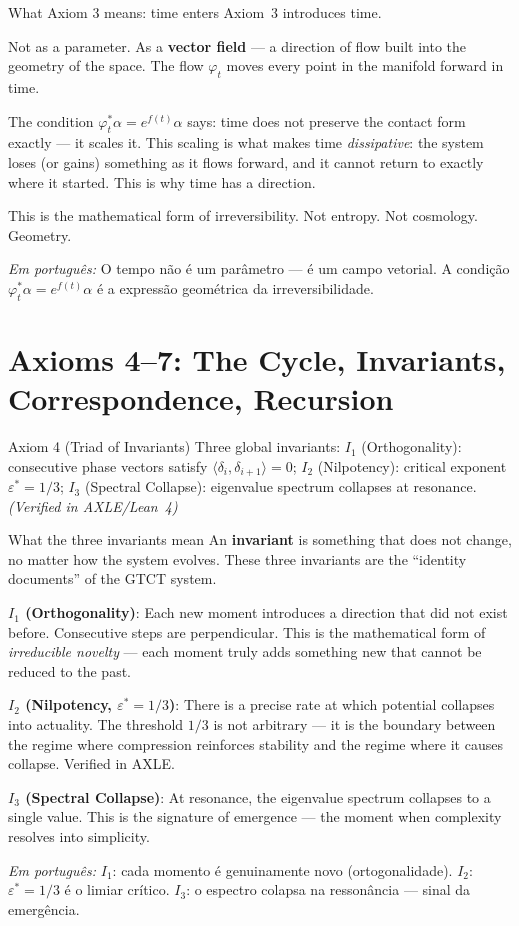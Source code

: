 \documentclass[12pt, openright]{book}
\theoremstyle{definition}
\theoremstyle{remark}
\begin{document}
\begin{studentbox}{What Axiom 3 means: time enters}
Axiom~3 introduces time.

Not as a parameter. As a \textbf{vector field} --- a direction
of flow built into the geometry of the space. The flow $\varphi_t$
moves every point in the manifold forward in time.

The condition $\varphi_t^* \alpha = e^{f(t)} \alpha$ says:
time does not preserve the contact form exactly --- it scales it.
This scaling is what makes time \textit{dissipative}: the system
loses (or gains) something as it flows forward, and it cannot
return to exactly where it started. This is why time has a direction.

This is the mathematical form of irreversibility.
Not entropy. Not cosmology. Geometry.

\textit{Em português:}
O tempo não é um parâmetro --- é um campo vetorial.
A condição $\varphi_t^* \alpha = e^{f(t)} \alpha$ é a expressão
geométrica da irreversibilidade.
\end{studentbox}

\section{Axioms 4--7: The Cycle, Invariants, Correspondence, Recursion}

\begin{formalbox}{Axiom 4 (Triad of Invariants)}
Three global invariants:
$I_1$ (Orthogonality): consecutive phase vectors satisfy
$\langle \delta_i, \delta_{i+1} \rangle = 0$;
$I_2$ (Nilpotency): critical exponent $\varepsilon^* = 1/3$;
$I_3$ (Spectral Collapse): eigenvalue spectrum collapses at resonance.
\hfill\textit{(Verified in AXLE/Lean~4)}
\end{formalbox}

\begin{studentbox}{What the three invariants mean}
An \textbf{invariant} is something that does not change,
no matter how the system evolves. These three invariants are
the ``identity documents'' of the GTCT system.

\textbf{$I_1$ (Orthogonality)}: Each new moment introduces a direction
that did not exist before. Consecutive steps are perpendicular.
This is the mathematical form of \textit{irreducible novelty} ---
each moment truly adds something new that cannot be reduced to the past.

\textbf{$I_2$ (Nilpotency, $\varepsilon^* = 1/3$)}: There is a precise
rate at which potential collapses into actuality. The threshold $1/3$
is not arbitrary --- it is the boundary between the regime where
compression reinforces stability and the regime where it causes collapse.
Verified in AXLE.

\textbf{$I_3$ (Spectral Collapse)}: At resonance, the eigenvalue spectrum
collapses to a single value. This is the signature of emergence ---
the moment when complexity resolves into simplicity.

\textit{Em português:}
$I_1$: cada momento é genuinamente novo (ortogonalidade).
$I_2$: $\varepsilon^* = 1/3$ é o limiar crítico.
$I_3$: o espectro colapsa na ressonância --- sinal da emergência.
\end{studentbox}
\end{document}
